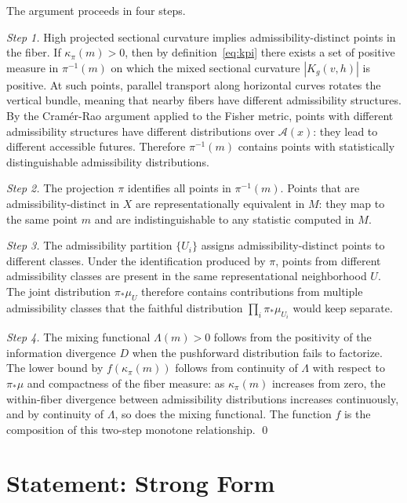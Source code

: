 \documentclass[12pt, oneside]{book}
\theoremstyle{plain-flyxion}
\theoremstyle{definition-flyxion}
\newcommand{\A}{\mathcal{A}}
\newcommand{\kpi}{\kappa_{\pi}}
\newcommand{\Lam}{\Lambda}
\begin{document}
The argument proceeds in four steps.

\medskip
\noindent\textit{Step 1.} High projected sectional curvature implies admissibility-distinct
points in the fiber. If $\kpi(m) > 0$, then by definition~\eqref{eq:kpi} there exists a
set of positive measure in $\pi^{-1}(m)$ on which the mixed sectional curvature
$|K_g(v,h)|$ is positive. At such points, parallel transport along horizontal curves
rotates the vertical bundle, meaning that nearby fibers have different admissibility
structures. By the Cramér-Rao argument applied to the Fisher metric, points with different
admissibility structures have different distributions over $\A(x)$: they lead to different
accessible futures. Therefore $\pi^{-1}(m)$ contains points with statistically
distinguishable admissibility distributions.

\medskip
\noindent\textit{Step 2.} The projection $\pi$ identifies all points in $\pi^{-1}(m)$.
Points that are admissibility-distinct in $X$ are representationally equivalent in $M$:
they map to the same point $m$ and are indistinguishable to any statistic computed in $M$.

\medskip
\noindent\textit{Step 3.} The admissibility partition $\{U_i\}$ assigns admissibility-distinct
points to different classes. Under the identification produced by $\pi$, points from
different admissibility classes are present in the same representational neighborhood
$U$. The joint distribution $\pi_*\mu_U$ therefore contains contributions from multiple
admissibility classes that the faithful distribution $\prod_i \pi_*\mu_{U_i}$ would
keep separate.

\medskip
\noindent\textit{Step 4.} The mixing functional $\Lam(m)>0$ follows from the positivity of
the information divergence $D$ when the pushforward distribution fails to factorize. The
lower bound by $f(\kpi(m))$ follows from continuity of $\Lam$ with respect to
$\pi_*\mu$ and compactness of the fiber measure: as $\kpi(m)$ increases from zero, the
within-fiber divergence between admissibility distributions increases continuously, and
by continuity of $\Lam$, so does the mixing functional. The function $f$ is the
composition of this two-step monotone relationship. \qed

\section{Statement: Strong Form}
\end{document}
